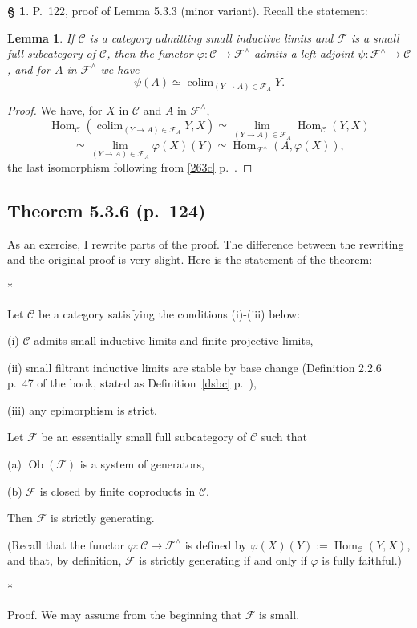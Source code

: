 \documentclass[12pt]{article}%
\newtheorem{lem}[thm]{Lemma}
\theoremstyle{remark}
\theoremstyle{definition}
\newtheorem{s}[thm]{\S}%
\newcommand{\nn}{\noindent}
\newcommand{\C}{\mathcal C}
\newcommand{\F}{\mathcal F}
\newcommand{\pp}{\varphi}
\DeclareMathOperator*{\colim}{colim}%
\DeclareMathOperator{\Hom}{Hom}%
\DeclareMathOperator{\Ob}{Ob}
\begin{document}
%

\begin{s} 
P.~122, proof of Lemma 5.3.3 (minor variant). Recall the statement: 

\begin{lem}
If $\C$ is a category admitting small inductive limits and $\F$ is a small full subcategory of $\C$, then the functor $\pp:\C\to\F^\wedge$ admits a left adjoint $\psi:\F^\wedge\to\C$, and for $A$ in $\F^\wedge$ we have 
$$
\psi(A)\simeq\colim_{(Y\to A)\in\F_A}Y. 
$$ 
\end{lem} 

\begin{proof}
We have, for $X$ in $\C$ and $A$ in $\F^\wedge$, 
$$
\Hom_\C\left(\colim_{(Y\to A)\in\F_A}Y,X\right)\simeq\lim_{(Y\to A)\in\F_A}\Hom_\C(Y,X)
$$ 
$$
\simeq\lim_{(Y\to A)\in\F_A}\pp(X)(Y)\simeq\Hom_{\F^\wedge}(A,\pp(X)),
$$  
the last isomorphism following from \eqref{263c} p.~\pageref{263c}.
\end{proof}
\end{s}


\subsection{Theorem 5.3.6 (p.~124)}\label{536}

As an exercise, I rewrite parts of the proof. The difference between the rewriting and the original proof is very slight. Here is the statement of the theorem:
%
\begin{center}*\end{center}
%
Let $\C$ be a category satisfying the conditions (i)-(iii) below:

\nn(i) $\C$ admits small inductive limits and finite projective limits, 

\nn(ii) small filtrant inductive limits are stable by base change (Definition 2.2.6 p.~47 of the book, stated as Definition~\ref{dsbc} p.~\pageref{dsbc}), 

\nn(iii) any epimorphism is strict.

\nn Let $\F$ be an essentially small full subcategory of $\C$ such that 

\nn(a) $\Ob(\F)$ is a system of generators,

\nn(b) $\F$ is closed by finite coproducts in $\C$. 

\nn Then $\F$ is strictly generating.

(Recall that the functor $\pp:\C\to\F^\wedge$ is defined by $\pp(X)(Y):=\Hom_\C(Y,X)$, and that, by definition, $\F$ is strictly generating if and only if $\pp$ is fully faithful.)
%
\begin{center}*\end{center}
%
Proof. We may assume from the beginning that $\F$ is small.
\end{document}

